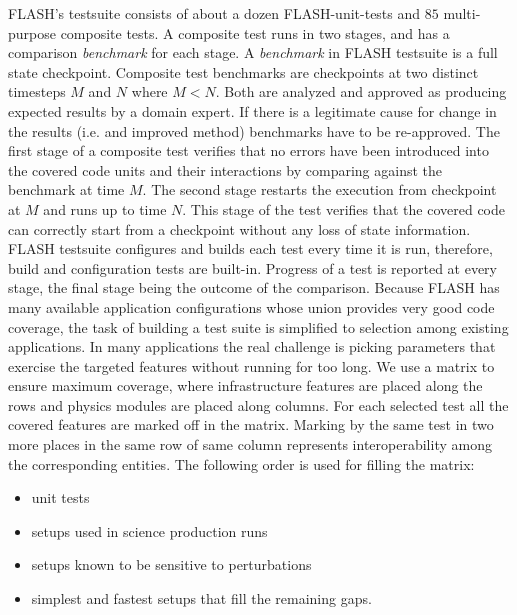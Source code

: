 FLASH's testsuite consists of about a dozen {FLASH-unit-tests} and
$85$ multi-purpose composite tests. A composite test runs in two
stages, and has a comparison {\em benchmark} for each stage. A {\em
  benchmark} in FLASH testsuite is a full state checkpoint. Composite
test benchmarks are checkpoints at two distinct timesteps $M$ and $N$ where
$M < N$. Both are analyzed and approved as producing expected results
by a domain expert. If there is a legitimate cause for change in the
results (i.e. and improved method) benchmarks have to be
re-approved. The first stage of a composite  test verifies that no
errors have been introduced into the covered code units and their interactions
by comparing against the benchmark at time $M$. The second
stage restarts the execution from checkpoint at $M$ and runs up to
time $N$. This stage of the test verifies that the covered code can
correctly start from a checkpoint without any loss of state
information. FLASH testsuite configures and builds each test every
time it is run, therefore, build and configuration tests are
built-in. Progress of a test is reported at every stage, the final
stage being the outcome of the comparison. Because FLASH has many
available application configurations whose union provides  
very good code coverage, the task of building a test suite is simplified
to selection among existing applications. In many applications the
real challenge is picking parameters that exercise the targeted
features without running for too long. We use a matrix
to ensure maximum coverage, where infrastructure features are placed
along the rows and physics modules are placed along columns. For each
selected test all the covered features are marked off in the
matrix. Marking by the same test in two more places in the same row of
same column represents interoperability among the corresponding
entities. The following order is used for filling the matrix:
\begin{itemize}
\item unit tests
\item setups used in science production runs
\item setups known to be sensitive to perturbations
\item simplest and fastest setups that fill the remaining gaps. 
\end{itemize} 

